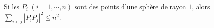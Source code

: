 Si les $P_i$ $(i = 1, \cdots, n)$ sont des points d'une sphère de rayon $1$, alors $\sum_{i<j} |P_iP_j|^2 \leq n^2$.
